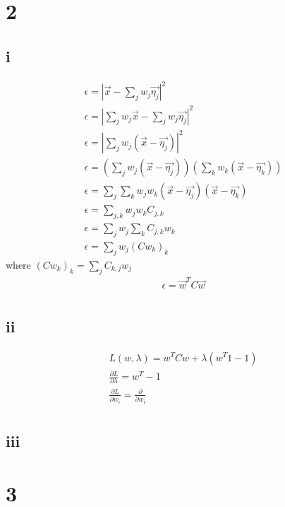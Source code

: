 \documentclass[11pt,a4paper]{article}
\begin{document}
\section*{2}

\subsection*{i}

\begin{gather*}
\epsilon = |\vec{x}  - \sum_j w_j \vec{\eta_j}|^2 \\
\epsilon = |\sum_j w_j \vec{x} -  \sum_j w_j \vec{\eta_j}|^2 \\
\epsilon = |\sum_j w_j (\vec{x} - \vec{\eta_j})|^2 \\
\epsilon = (\sum_j w_j (\vec{x} - \vec{\eta_j})) (\sum_k w_k (\vec{x} - \vec{\eta_k})) \\
\epsilon = \sum_j \sum_k w_j w_k  (\vec{x} - \vec{\eta_j}) (\vec{x} - \vec{\eta_k}) \\
\epsilon = \sum_{j,k} w_j w_k C_{j,k} \\
\epsilon = \sum_j w_j \sum_k C_{j,k} w_k \\
\epsilon = \sum_j w_j (C w_k)_k
\end{gather*}
where $(C w_k)_k = \sum_j C_{k,j} w_j$
\begin{gather*}
\epsilon = \vec{w}^TC\vec{w} \\
\end{gather*}


\subsection*{ii}

\begin{gather*}
L(w,\lambda) = w^T Cw + \lambda(w^T 1 - 1) \\
\frac{\partial L}{\partial \lambda} = w^T  -1 \\
\frac{\partial L}{\partial w_i} = \frac{\partial}{\partial w_i} \\
\end{gather*}
\subsection*{iii}


\section*{3}
\end{document}
